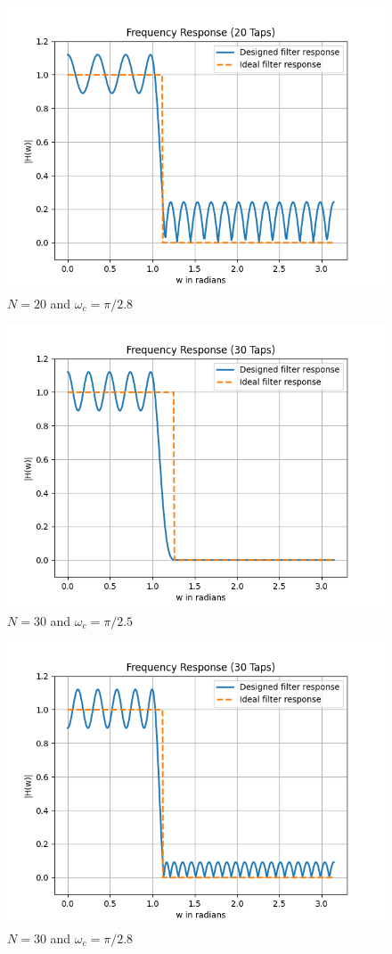 \documentclass[conference]{IEEEtran}
\begin{document}
\begin{enumerate}[label=(\alph*)]
\begin{figure}[!h]
	\begin{center} 
	    \includegraphics[width=0.7\columnwidth]{figs/A/N20_w2}
	\end{center}
\caption{$N=20$ and $\omega_c = \pi/2.8$}
\label{fig:Fig3}
\end{figure}

\begin{figure}[!h]
	\begin{center} 
	    \includegraphics[width=0.7\columnwidth]{figs/A/N30_w1}
	\end{center}
\caption{$N=30$ and $\omega_c = \pi/2.5$}
\label{fig:Fig4}
\end{figure}

\begin{figure}[!h]
	\begin{center} 
	    \includegraphics[width=0.7\columnwidth]{figs/A/N30_w2}
	\end{center}
\caption{$N=30$ and $\omega_c = \pi/2.8$}
\label{fig:Fig5}
\end{figure}


\end{enumerate}
\end{document}
